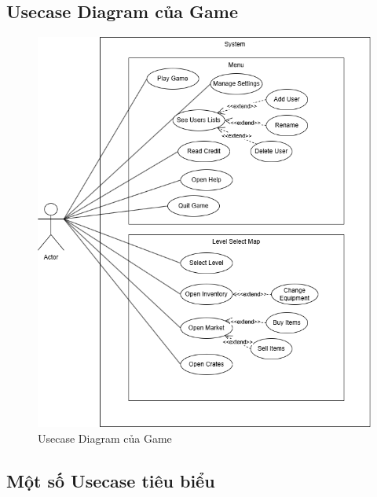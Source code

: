 \subsection{Usecase Diagram của Game}
\begin{figure}[H]
	\centering
	\includegraphics[width=\textwidth]{Images/UseCase.png}
	\vspace{0.5cm}
	\caption{Usecase Diagram của Game}
\end{figure}
\subsection{Một số Usecase tiêu biểu}
